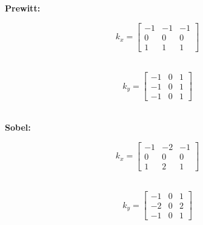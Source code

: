 \documentclass[a4paper,11pt]{article}
\begin{document}
\noindent
\begin{minipage}{0.2\textwidth}
    \centering
    \textbf{Prewitt:}
\end{minipage}\hfill
\begin{minipage}{0.4\textwidth}
    \begin{equation*}
        k_x = 
        \begin{bmatrix}
        -1 & -1 & -1 \\
        0 & 0 & 0 \\
        1 & 1 & 1
        \end{bmatrix}
    \end{equation*}
    \\
\end{minipage}\hfill
\begin{minipage}{0.4\textwidth}
    \begin{equation*}
        k_y = 
        \begin{bmatrix}
        -1 & 0 & 1 \\
        -1 & 0 & 1 \\
        -1 & 0 & 1
        \end{bmatrix}
    \end{equation*}
    \\
\end{minipage}\hfill
\begin{minipage}{0.4\textwidth}
\end{minipage}\hfill

\noindent
\begin{minipage}{0.2\textwidth}
    \centering
    \textbf{Sobel:}
\end{minipage}\hfill
\begin{minipage}{0.3\textwidth}
    \begin{equation*}
        k_x = 
        \begin{bmatrix}
        -1 & -2 & -1 \\
        0 & 0 & 0 \\
        1 & 2 & 1
        \end{bmatrix}
    \end{equation*}
    \\
\end{minipage}\hfill
\begin{minipage}{0.4\textwidth}
    \begin{equation*}
        k_y = 
        \begin{bmatrix}
        -1 & 0 & 1 \\
        -2 & 0 & 2 \\
        -1 & 0 & 1
        \end{bmatrix}
    \end{equation*}  
    \\
\end{minipage}\hfill
\end{document}
